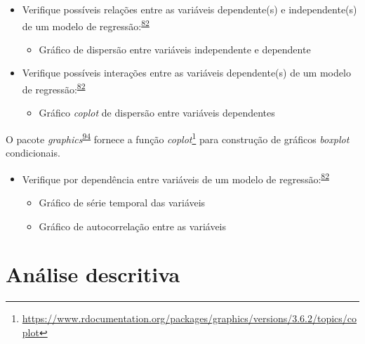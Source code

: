 \documentclass[
  a4paper,
]{book}
\providecommand{\tightlist}{%
  \setlength{\itemsep}{0pt}\setlength{\parskip}{0pt}}
\renewcommand{\href}[2]{#2\footnote{\url{#1}}}
\newenvironment{infobox}[1]
  {
  \begin{itemize}
  \renewcommand{\labelitemi}{
    \raisebox{-.7\height}[0pt][0pt]{
      {\setkeys{Gin}{width=3em,keepaspectratio}
        \texttt{[image: \#1]}}
    }
  }
  \setlength{\fboxsep}{1em}
  \begin{blackbox}
  \item
  }
  {
  \end{blackbox}
  \end{itemize}
  }
\begin{document}
\begin{itemize}
\item
  Verifique possíveis relações entre as variáveis dependente(s) e independente(s) de um modelo de regressão:\textsuperscript{\protect\hyperlink{ref-zuur2009}{82}}

  \begin{itemize}
  \tightlist
  \item
    Gráfico de dispersão entre variáveis independente e dependente
  \end{itemize}
\end{itemize}

\begin{itemize}
\item
  Verifique possíveis interações entre as variáveis dependente(s) de um modelo de regressão:\textsuperscript{\protect\hyperlink{ref-zuur2009}{82}}

  \begin{itemize}
  \tightlist
  \item
    Gráfico \emph{coplot} de dispersão entre variáveis dependentes
  \end{itemize}
\end{itemize}

\begin{infobox}{images/Rlogo}
O pacote \emph{graphics}\textsuperscript{\protect\hyperlink{ref-graphics}{94}} fornece a função \href{https://www.rdocumentation.org/packages/graphics/versions/3.6.2/topics/coplot}{\emph{coplot}} para construção de gráficos \emph{boxplot} condicionais.

\end{infobox}

\begin{itemize}
\item
  Verifique por dependência entre variáveis de um modelo de regressão:\textsuperscript{\protect\hyperlink{ref-zuur2009}{82}}

  \begin{itemize}
  \item
    Gráfico de série temporal das variáveis
  \item
    Gráfico de autocorrelação entre as variáveis
  \end{itemize}
\end{itemize}

\hypertarget{analise-descritiva}{%
\chapter{\texorpdfstring{\textbf{Análise descritiva}}{Análise descritiva}}\label{analise-descritiva}}
\end{document}
